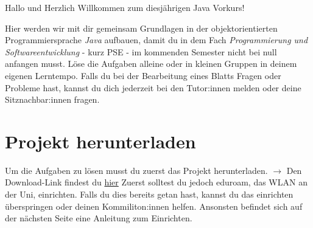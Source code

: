 \begin{center}
	Hallo und Herzlich Willkommen zum diesjährigen Java Vorkurs!\\
\end{center}
Hier werden wir mit dir gemeinsam Grundlagen in der objektorientierten Programmiersprache \textit{Java} aufbauen, damit du in dem Fach \textit{Programmierung und Softwareentwicklung} - kurz PSE - im kommenden Semester nicht bei null anfangen musst.\newline
Löse die Aufgaben alleine oder in kleinen Gruppen in deinem eigenen Lerntempo.\newline
Falls du bei der Bearbeitung eines Blatts Fragen oder Probleme hast, kannst du dich jederzeit bei den Tutor:innen melden oder deine Sitznachbar:innen fragen.\newline

\section*{Projekt herunterladen}
Um die Aufgaben zu lösen musst du zuerst das Projekt herunterladen.\newline
$\rightarrow$ Den Download-Link findest du \href{\jvkpackageurl}{hier}\newline
Zuerst solltest du jedoch eduroam, das WLAN an der Uni, einrichten. 
Falls du dies bereits getan hast, kannst du das einrichten überspringen oder deinen Kommiliton:innen helfen. 
Ansonsten befindet sich auf der nächsten Seite eine Anleitung zum Einrichten.
\newpage
